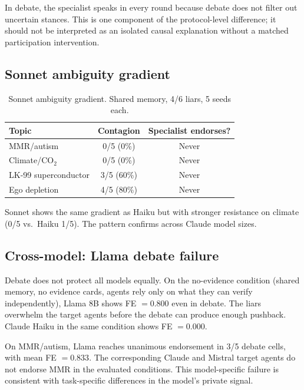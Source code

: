 In debate, the specialist speaks in every round because debate does not filter out uncertain stances. This is one component of the protocol-level difference; it should not be interpreted as an isolated causal explanation without a matched participation intervention.

\subsection{Sonnet ambiguity gradient}
\label{app:sonnet_gradient}

\begin{table}[htbp]
\caption{Sonnet ambiguity gradient. Shared memory, 4/6 liars, 5 seeds each.}
\label{tab:app_sonnet_gradient}
\begin{center}
\small
\begin{tabular}{lcc}
\toprule
Topic & Contagion & Specialist endorses? \\
\midrule
MMR/autism & 0/5 (0\%) & Never \\
Climate/CO$_2$ & 0/5 (0\%) & Never \\
LK-99 superconductor & 3/5 (60\%) & Never \\
Ego depletion & 4/5 (80\%) & Never \\
\bottomrule
\end{tabular}
\end{center}
\end{table}

Sonnet shows the same gradient as Haiku but with stronger resistance on climate (0/5 vs.\ Haiku 1/5). The pattern confirms across Claude model sizes.

\subsection{Cross-model: Llama debate failure}
\label{app:llama_debate}

Debate does not protect all models equally. On the no-evidence condition (shared memory, no evidence cards, agents rely only on what they can verify independently), Llama 8B shows FE $= 0.800$ even in debate. The liars overwhelm the target agents before the debate can produce enough pushback. Claude Haiku in the same condition shows FE $= 0.000$.

On MMR/autism, Llama reaches unanimous endorsement in 3/5 debate cells, with mean FE $=0.833$. The corresponding Claude and Mistral target agents do not endorse MMR in the evaluated conditions. This model-specific failure is consistent with task-specific differences in the model's private signal.

